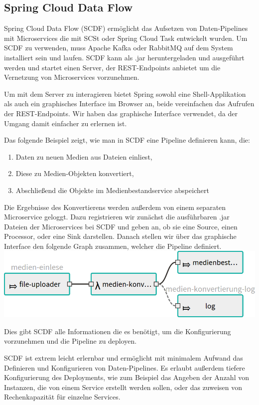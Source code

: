 \documentclass{article}
\begin{document}
\subsection{Spring Cloud Data Flow}

Spring Cloud Data Flow (SCDF) ermöglicht das Aufsetzen von Daten-Pipelines mit Microservices die mit SCSt oder Spring Cloud Task entwickelt wurden.
Um SCDF zu verwenden, muss Apache Kafka oder RabbitMQ auf dem System installiert sein und laufen.
SCDF kann als .jar heruntergeladen und ausgeführt werden und startet einen Server, der REST-Endpoints anbietet um die Vernetzung von Microservices vorzunehmen.

Um mit dem Server zu interagieren bietet Spring sowohl eine Shell-Applikation als auch ein graphisches Interface im Browser an, beide vereinfachen das Aufrufen der REST-Endpoints.
Wir haben das graphische Interface verwendet, da der Umgang damit einfacher zu erlernen ist.

Das folgende Beispiel zeigt, wie man in SCDF eine Pipeline definieren kann, die:
\begin{enumerate}
\item Daten zu neuen Medien aus Dateien einliest,
\item Diese zu Medien-Objekten konvertiert,
\item Abschließend die Objekte im Medienbestandservice abspeichert
\end{enumerate}
Die Ergebnisse des Konvertierens werden außerdem von einem separaten Microservice geloggt.
Dazu registrieren wir zunächst die ausführbaren .jar Dateien der Microservices bei SCDF und geben an, ob sie eine Source, einen Processor, oder eine Sink darstellen.
Danach stellen wir über das graphische Interface den folgende Graph zusammen, welcher die Pipeline definiert.\medskip\\
\includegraphics[width=\textwidth]{stream-small.png}

Dies gibt SCDF alle Informationen die es benötigt, um die Konfigurierung vorzunehmen und die Pipeline zu deployen.

SCDF ist extrem leicht erlernbar und ermöglicht mit minimalem Aufwand das Definieren und Konfigurieren von Daten-Pipelines.
Es erlaubt außerdem tiefere Konfigurierung des Deployments, wie zum Beispiel das Angeben der Anzahl von Instanzen, die von einem Service erstellt werden sollen, oder das zuweisen von Rechenkapazität für einzelne Services.
\end{document}
